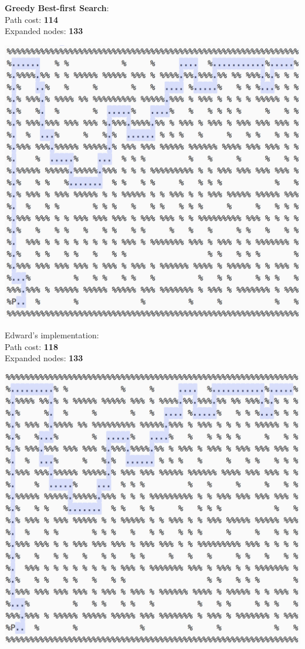 \documentclass[11pt]{article}
\begin{document}
\textbf{Greedy Best-first Search}:\\
Path cost: \textbf{114}\\
Expanded nodes: \textbf{133}
\begin{center}
\includegraphics[scale=0.8]{medium-maze/gbfs.png}
\end{center}
\pagebreak

Edward's implementation:\\
Path cost: \textbf{118}\\
Expanded nodes: \textbf{133}
\begin{center}
\includegraphics[scale=0.8]{medium-maze/gbfs-ed.png}
\end{center}
\pagebreak
\end{document}
